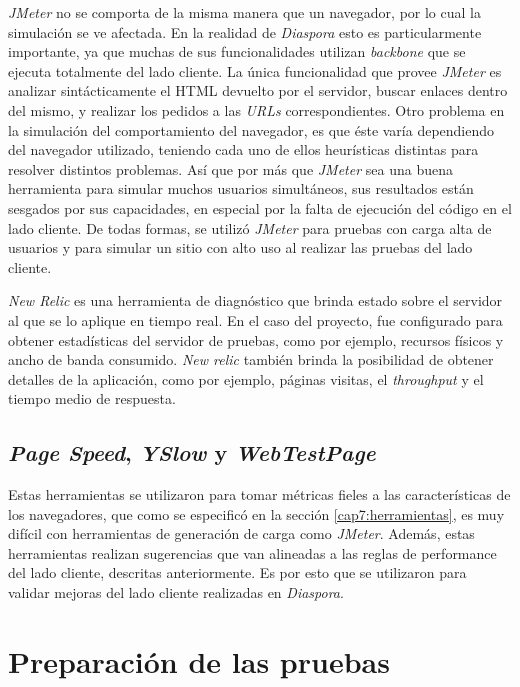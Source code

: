 \emph{JMeter} no se comporta de la misma manera que un navegador, por lo cual la simulación se ve afectada. En la realidad de \emph{Diaspora} esto es particularmente importante, 
ya que muchas de sus funcionalidades utilizan \emph{backbone} que se ejecuta totalmente del lado cliente. La única funcionalidad que provee \emph{JMeter} es analizar 
sintácticamente el HTML devuelto por el servidor, buscar enlaces dentro del mismo, y realizar los pedidos a las \emph{URLs} correspondientes. Otro problema en la simulación del
comportamiento del navegador, es que éste varía dependiendo del navegador utilizado, teniendo cada uno de ellos heurísticas distintas para resolver distintos problemas. Así que por 
más que \emph{JMeter} sea una buena herramienta para simular muchos usuarios simultáneos, sus resultados están sesgados por sus capacidades, en especial por la falta de 
ejecución del código en el lado cliente. De todas formas, se utilizó \emph{JMeter} para pruebas con carga alta de usuarios y para simular un sitio con alto uso al realizar las pruebas 
del lado cliente.

\emph{New Relic} es una herramienta de diagnóstico que brinda estado sobre el servidor al que se lo aplique en tiempo real. En el caso del proyecto, fue configurado para
obtener estadísticas del servidor de pruebas, como por ejemplo, recursos físicos y ancho de banda consumido. \emph{New relic} también brinda la posibilidad de obtener
detalles de la aplicación, como por ejemplo, páginas visitas, el \emph{throughput} y el tiempo medio de respuesta.

\subsection{\emph{Page Speed}, \emph{YSlow} y \emph{WebTestPage} }

Estas herramientas se utilizaron para tomar métricas fieles a las características de los navegadores, que como se especificó en la sección \ref{cap7:herramientas}, es muy difícil con
herramientas de generación de carga como \emph{JMeter}. Además, estas herramientas realizan sugerencias que van alineadas a las reglas de performance del lado cliente, descritas 
anteriormente. Es por esto que se utilizaron para validar mejoras del lado cliente realizadas en \emph{Diaspora}. 

\section{Preparación de las pruebas}
\label{cap7:prep_pruebas}

